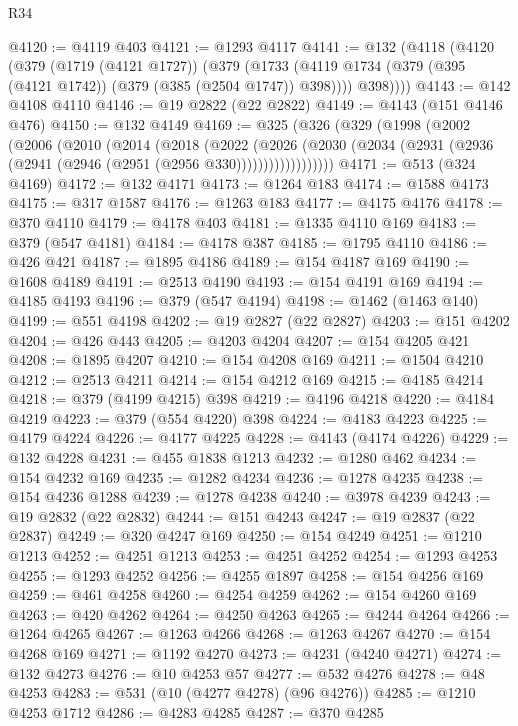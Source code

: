 \begin{lexlean}{R34}
\begin{coremodule}
@4120 := @4119 @403
@4121 := @1293 @4117
@4141 := @132
    (@4118
      (@4120
        (@379
          (@1719 (@4121 @1727))
          (@379
            (@1733 (@4119 @1734 (@379 (@395 (@4121 @1742)) (@379 (@385 (@2504 @1747)) @398))))
            @398))))
@4143 := @142 @4108 @4110
@4146 := @19 @2822 (@22 @2822)
@4149 := @4143 (@151 @4146 @476)
@4150 := @132 @4149
@4169 := @325
    (@326
      (@329
        (@1998
          (@2002
            (@2006
              (@2010
                (@2014
                  (@2018
                    (@2022
                      (@2026
                        (@2030
                          (@2034 (@2931 (@2936 (@2941 (@2946 (@2951 (@2956 @330))))))))))))))))))
@4171 := @513 (@324 @4169)
@4172 := @132 @4171
@4173 := @1264 @183
@4174 := @1588 @4173
@4175 := @317 @1587
@4176 := @1263 @183
@4177 := @4175 @4176
@4178 := @370 @4110
@4179 := @4178 @403
@4181 := @1335 @4110 @169
@4183 := @379 (@547 @4181)
@4184 := @4178 @387
@4185 := @1795 @4110
@4186 := @426 @421
@4187 := @1895 @4186
@4189 := @154 @4187 @169
@4190 := @1608 @4189
@4191 := @2513 @4190
@4193 := @154 @4191 @169
@4194 := @4185 @4193
@4196 := @379 (@547 @4194)
@4198 := @1462 (@1463 @140)
@4199 := @551 @4198
@4202 := @19 @2827 (@22 @2827)
@4203 := @151 @4202
@4204 := @426 @443
@4205 := @4203 @4204
@4207 := @154 @4205 @421
@4208 := @1895 @4207
@4210 := @154 @4208 @169
@4211 := @1504 @4210
@4212 := @2513 @4211
@4214 := @154 @4212 @169
@4215 := @4185 @4214
@4218 := @379 (@4199 @4215) @398
@4219 := @4196 @4218
@4220 := @4184 @4219
@4223 := @379 (@554 @4220) @398
@4224 := @4183 @4223
@4225 := @4179 @4224
@4226 := @4177 @4225
@4228 := @4143 (@4174 @4226)
@4229 := @132 @4228
@4231 := @455 @1838 @1213
@4232 := @1280 @462
@4234 := @154 @4232 @169
@4235 := @1282 @4234
@4236 := @1278 @4235
@4238 := @154 @4236 @1288
@4239 := @1278 @4238
@4240 := @3978 @4239
@4243 := @19 @2832 (@22 @2832)
@4244 := @151 @4243
@4247 := @19 @2837 (@22 @2837)
@4249 := @320 @4247 @169
@4250 := @154 @4249
@4251 := @1210 @1213
@4252 := @4251 @1213
@4253 := @4251 @4252
@4254 := @1293 @4253
@4255 := @1293 @4252
@4256 := @4255 @1897
@4258 := @154 @4256 @169
@4259 := @461 @4258
@4260 := @4254 @4259
@4262 := @154 @4260 @169
@4263 := @420 @4262
@4264 := @4250 @4263
@4265 := @4244 @4264
@4266 := @1264 @4265
@4267 := @1263 @4266
@4268 := @1263 @4267
@4270 := @154 @4268 @169
@4271 := @1192 @4270
@4273 := @4231 (@4240 @4271)
@4274 := @132 @4273
@4276 := @10 @4253 @57
@4277 := @532 @4276
@4278 := @48 @4253
@4283 := @531 (@10 (@4277 @4278) (@96 @4276))
@4285 := @1210 @4253 @1712
@4286 := @4283 @4285
@4287 := @370 @4285

\end{coremodule}
\end{lexlean}
